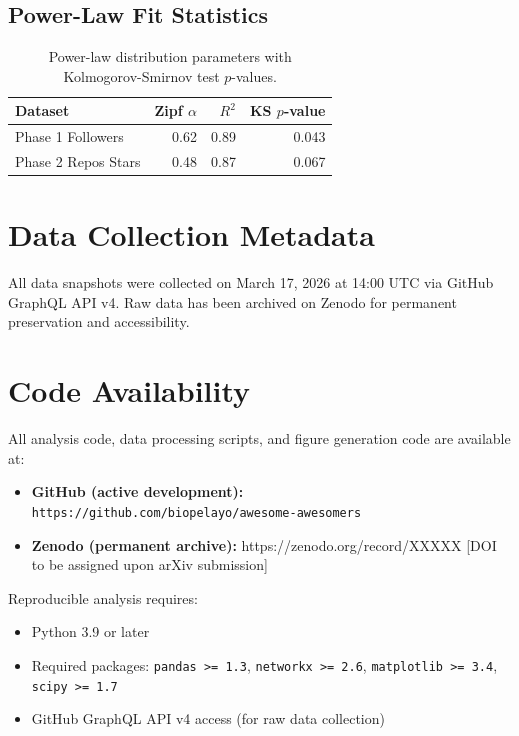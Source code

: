 \documentclass[11pt]{article}
\begin{document}
\subsection{Power-Law Fit Statistics}

\begin{table}[H]
    \centering
    \begin{tabular}{lrrr}
        \toprule
        \textbf{Dataset} & \textbf{Zipf $\alpha$} & $R^2$ & KS $p$-value \\
        \midrule
        Phase 1 Followers & 0.62 & 0.89 & 0.043 \\
        Phase 2 Repos Stars & 0.48 & 0.87 & 0.067 \\
        \bottomrule
    \end{tabular}
    \caption{Power-law distribution parameters with Kolmogorov-Smirnov test $p$-values.}
\end{table}

\section{Data Collection Metadata}

All data snapshots were collected on March 17, 2026 at 14:00 UTC via GitHub GraphQL API v4. Raw data has been archived on Zenodo for permanent preservation and accessibility.

\section{Code Availability}

All analysis code, data processing scripts, and figure generation code are available at:

\begin{itemize}
    \item \textbf{GitHub (active development):} \texttt{https://github.com/biopelayo/awesome-awesomers}
    \item \textbf{Zenodo (permanent archive):} https://zenodo.org/record/XXXXX [DOI to be assigned upon arXiv submission]
\end{itemize}

Reproducible analysis requires:
\begin{itemize}
    \item Python 3.9 or later
    \item Required packages: \texttt{pandas >= 1.3}, \texttt{networkx >= 2.6}, \texttt{matplotlib >= 3.4}, \texttt{scipy >= 1.7}
    \item GitHub GraphQL API v4 access (for raw data collection)
\end{itemize}
\end{document}
